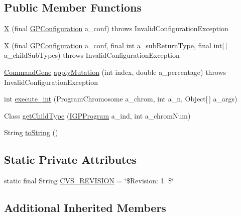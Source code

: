 \subsection*{Public Member Functions}
\begin{DoxyCompactItemize}
\item 
\hyperlink{classexamples_1_1gp_1_1painted_desert_1_1_x_a3f3076085e46d2383f0d23c81043679e}{X} (final \hyperlink{classorg_1_1jgap_1_1gp_1_1impl_1_1_g_p_configuration}{G\-P\-Configuration} a\-\_\-conf)  throws Invalid\-Configuration\-Exception 
\item 
\hyperlink{classexamples_1_1gp_1_1painted_desert_1_1_x_af195e4009c0f9751bfa8d3af9bf14ffe}{X} (final \hyperlink{classorg_1_1jgap_1_1gp_1_1impl_1_1_g_p_configuration}{G\-P\-Configuration} a\-\_\-conf, final int a\-\_\-sub\-Return\-Type, final int\mbox{[}$\,$\mbox{]} a\-\_\-child\-Sub\-Types)  throws Invalid\-Configuration\-Exception 
\item 
\hyperlink{classorg_1_1jgap_1_1gp_1_1_command_gene}{Command\-Gene} \hyperlink{classexamples_1_1gp_1_1painted_desert_1_1_x_a90edac8e70e1a2209db398cfcf3db6b6}{apply\-Mutation} (int index, double a\-\_\-percentage)  throws Invalid\-Configuration\-Exception 
\item 
int \hyperlink{classexamples_1_1gp_1_1painted_desert_1_1_x_aa3f631f39b7dadcb8b3218ef2a6990e0}{execute\-\_\-int} (Program\-Chromosome a\-\_\-chrom, int a\-\_\-n, Object\mbox{[}$\,$\mbox{]} a\-\_\-args)
\item 
Class \hyperlink{classexamples_1_1gp_1_1painted_desert_1_1_x_a0a59b521a67f9951cb1983430342ad0d}{get\-Child\-Type} (\hyperlink{interfaceorg_1_1jgap_1_1gp_1_1_i_g_p_program}{I\-G\-P\-Program} a\-\_\-ind, int a\-\_\-chrom\-Num)
\item 
String \hyperlink{classexamples_1_1gp_1_1painted_desert_1_1_x_abe9e8d98da2d3772c728edaae6a39086}{to\-String} ()
\end{DoxyCompactItemize}
\subsection*{Static Private Attributes}
\begin{DoxyCompactItemize}
\item 
static final String \hyperlink{classexamples_1_1gp_1_1painted_desert_1_1_x_af4f68f41445c8db4de33cd6cdc500a9b}{C\-V\-S\-\_\-\-R\-E\-V\-I\-S\-I\-O\-N} = \char`\"{}\$Revision\-: 1. \$\char`\"{}
\end{DoxyCompactItemize}
\subsection*{Additional Inherited Members}


